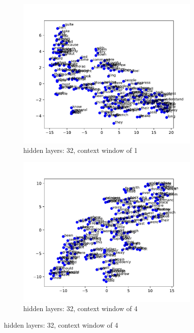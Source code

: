 \documentclass[12pt]{article} \usepackage{COSC420style} \usepackage{soul}
\begin{document}
\begin{figure}[htbp]
	\centering
	\begin{subfigure}[b]{0.45\textwidth}
		\includegraphics[width=\textwidth]{./figures/dim_32_ctx_1_embedding.pdf}
		\caption{hidden layers: 32, context window of 1}
		\label{fig:32_1}
	\end{subfigure}
	\begin{subfigure}[b]{0.45\textwidth}
		\includegraphics[width=\textwidth]{./figures/dim_32_ctx_4_embedding.pdf}
		\caption{hidden layers: 32, context window of 4}

\end{subfigure}
\end{figure}
\end{document}
